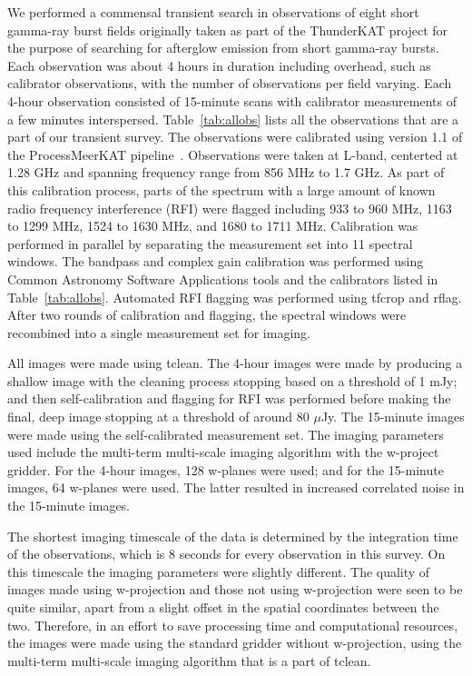 \documentclass[12pt]{article}
\begin{document}
We performed a commensal transient search in observations of eight short gamma-ray burst fields originally taken as part of the ThunderKAT project for the purpose of searching for afterglow emission from short gamma-ray bursts. Each observation was about 4 hours in duration including overhead, such as calibrator observations, with the number of observations per field varying. Each 4-hour observation consisted of 15-minute scans with calibrator measurements of a few minutes interspersed. Table~\ref{tab:allobs} lists all the observations that are a part of our transient survey. The observations were calibrated using version 1.1 of the ProcessMeerKAT pipeline~\citep[{\sc ProcessMeerKAT};][]{pminprep}. Observations were taken at L-band, centerted at 1.28 GHz and spanning frequency range from 856 MHz to 1.7 GHz. As part of this calibration process, parts of the spectrum with a large amount of known radio frequency interference (RFI) were flagged including 933 to 960 MHz, 1163 to 1299 MHz, 1524 to 1630 MHz, and 1680 to 1711 MHz. Calibration was performed in parallel by separating the measurement set into 11 spectral windows. The bandpass and complex gain calibration was performed using Common Astronomy Software Applications \citep[{\sc CASA;}][]{2022arXiv221002276T} tools and the calibrators listed in Table~\ref{tab:allobs}. Automated RFI flagging was performed using tfcrop and rflag. After two rounds of calibration and flagging, the spectral windows were recombined into a single measurement set for imaging. 

All images were made using tclean. The 4-hour images were made by producing a shallow image with the cleaning process stopping based on a threshold of 1 mJy; and then self-calibration and flagging for RFI was performed before making the final, deep image stopping at a threshold of around 80 $\mu$Jy. The 15-minute images were made using the self-calibrated measurement set. The imaging parameters used include the multi-term multi-scale imaging algorithm with the w-project gridder. For the 4-hour images, 128 w-planes were used; and for the 15-minute images, 64 w-planes were used. The latter resulted in increased correlated noise in the 15-minute images. 

The shortest imaging timescale of the data is determined by the integration time of the observations, which is 8 seconds for every observation in this survey. On this timescale the imaging parameters were slightly different. The quality of images made using w-projection and those not using w-projection were seen to be quite similar, apart from a slight offset in the spatial coordinates between the two. Therefore, in an effort to save processing time and computational resources, the images were made using the standard gridder without w-projection, using the multi-term multi-scale imaging algorithm that is a part of tclean.
\end{document}
